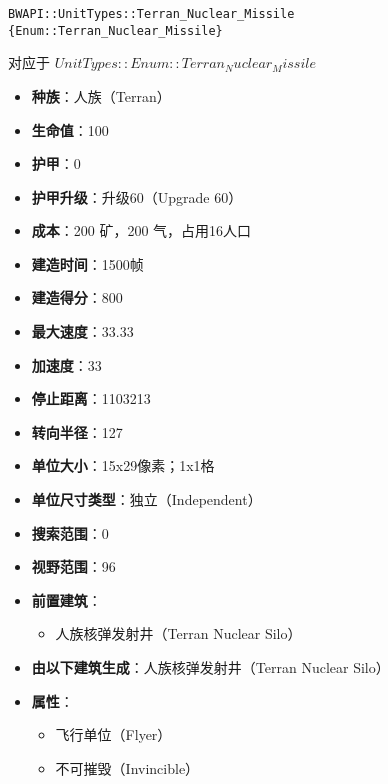 \begin{tcolorbox}[colback=white, colframe=black!60!white, title=Terran\_Nuclear\_Missile(), arc=0mm]
    \begin{verbatim}
BWAPI::UnitTypes::Terran_Nuclear_Missile {Enum::Terran_Nuclear_Missile}
    \end{verbatim}
    对应于  $ UnitTypes::Enum::Terran_Nuclear_Missile $ 
    
    \begin{itemize}
        \item \textbf{种族}：人族（Terran）
        \item \textbf{生命值}：100
        \item \textbf{护甲}：0
        \item \textbf{护甲升级}：升级60（Upgrade 60）
        \item \textbf{成本}：200 矿，200 气，占用16人口
        \item \textbf{建造时间}：1500帧
        \item \textbf{建造得分}：800
        \item \textbf{最大速度}：33.33
        \item \textbf{加速度}：33
        \item \textbf{停止距离}：1103213
        \item \textbf{转向半径}：127
        \item \textbf{单位大小}：15x29像素；1x1格
        \item \textbf{单位尺寸类型}：独立（Independent）
        \item \textbf{搜索范围}：0
        \item \textbf{视野范围}：96
        \item \textbf{前置建筑}：
            \begin{itemize}
                \item 人族核弹发射井（Terran Nuclear Silo）
            \end{itemize}
        \item \textbf{由以下建筑生成}：人族核弹发射井（Terran Nuclear Silo）
        \item \textbf{属性}：
            \begin{itemize}
                \item 飞行单位（Flyer）
                \item 不可摧毁（Invincible）
            \end{itemize}
    \end{itemize}
\end{tcolorbox}

